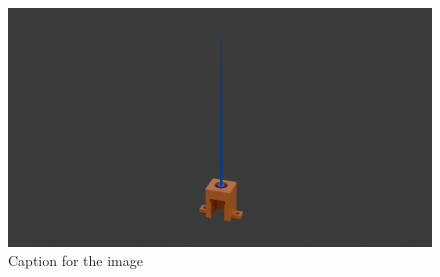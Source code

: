 \documentclass[landscape,twocolumn]{article}
\begin{document}

\begin{figure}[p]
    \centering
    \includegraphics[width=0.875\linewidth]{f.png} %
    \caption{Caption for the image}
\end{figure}


\end{document}
